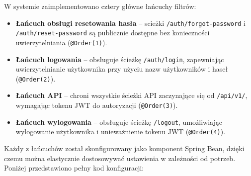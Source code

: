 W systemie zaimplementowano cztery główne łańcuchy filtrów:
\begin{itemize}
    \item \textbf{Łańcuch obsługi resetowania hasła} -- scieżki \texttt{/auth/forgot-password} i \texttt{/auth/reset-password} są publicznie dostępne bez konieczności uwierzytelniania (\texttt{@Order(1)}).
    \item \textbf{Łańcuch logowania} -- obsługuje ścieżkę \texttt{/auth/login}, zapewniając uwierzytelnianie użytkownika przy użyciu nazw użytkowników i haseł (\texttt{@Order(2)}).
    \item \textbf{Łańcuch API} -- chroni wszystkie ścieżki API zaczynające się od \texttt{/api/v1/}, wymagając tokenu JWT do autoryzacji (\texttt{@Order(3)}).
    \item \textbf{Łańcuch wylogowania} -- obsługuje ścieżkę \texttt{/logout}, umożliwiając wylogowanie użytkownika i unieważnienie tokenu JWT (\texttt{@Order(4)}).
\end{itemize}

Każdy z łańcuchów został skonfigurowany jako komponent Spring Bean, dzięki czemu można elastycznie dostosowywać ustawienia w zależności od potrzeb. Poniżej przedstawiono pełny kod konfiguracji:

